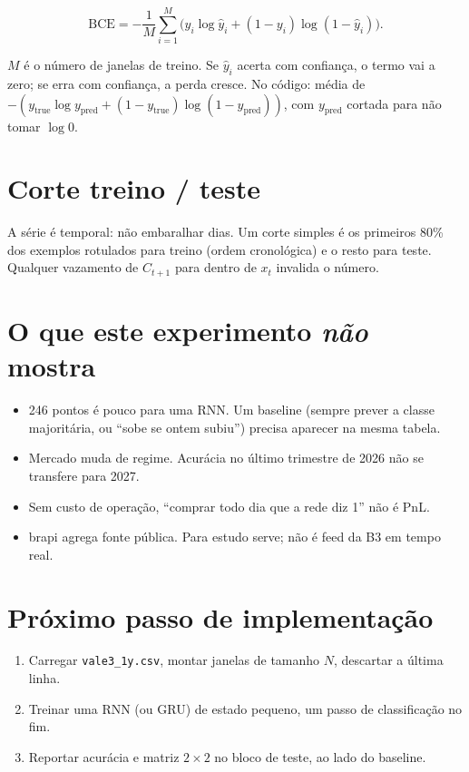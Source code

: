\documentclass[11pt]{article}
\begin{document}
\begin{equation}
  \mathrm{BCE}
  =
  -\frac{1}{M}
  \sum_{i=1}^{M}
  \bigl(
    y_i \log \hat{y}_i
    +
    (1-y_i)\log(1-\hat{y}_i)
  \bigr).
\end{equation}

\(M\) é o número de janelas de treino. Se \(\hat{y}_i\) acerta com confiança, o termo vai a zero; se erra com confiança, a perda cresce. No código: média de \(-(y_{\mathrm{true}}\log y_{\mathrm{pred}}+(1-y_{\mathrm{true}})\log(1-y_{\mathrm{pred}}))\), com \(y_{\mathrm{pred}}\) cortada para não tomar \(\log 0\).

\section{Corte treino / teste}

A série é temporal: não embaralhar dias. Um corte simples é os primeiros 80\% dos exemplos rotulados para treino (ordem cronológica) e o resto para teste. Qualquer vazamento de \(C_{t+1}\) para dentro de \(x_t\) invalida o número.

\section{O que este experimento \emph{não} mostra}

\begin{itemize}
  \item 246 pontos é pouco para uma RNN. Um baseline (sempre prever a classe majoritária, ou ``sobe se ontem subiu'') precisa aparecer na mesma tabela.
  \item Mercado muda de regime. Acurácia no último trimestre de 2026 não se transfere para 2027.
  \item Sem custo de operação, ``comprar todo dia que a rede diz 1'' não é PnL.
  \item brapi agrega fonte pública. Para estudo serve; não é feed da B3 em tempo real.
\end{itemize}

\section{Próximo passo de implementação}

\begin{enumerate}
  \item Carregar \texttt{vale3\_1y.csv}, montar janelas de tamanho \(N\), descartar a última linha.
  \item Treinar uma RNN (ou GRU) de estado pequeno, um passo de classificação no fim.
  \item Reportar acurácia e matriz \(2\times 2\) no bloco de teste, ao lado do baseline.
\end{enumerate}
\end{document}
